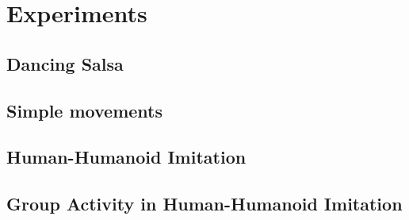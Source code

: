 
\chapter{Experiments}

\ifpdf
    \graphicspath{{chapter4/figs/raster/}{chapter4/figs/PDF/}{chapter4/figs/}}
\else
    \graphicspath{{chapter4/figs/vector/}{chapter4/figs/}}
\fi



\section{Dancing Salsa}
\section{Simple movements}
\section{Human-Humanoid Imitation}
\section{Group Activity in Human-Humanoid Imitation}
